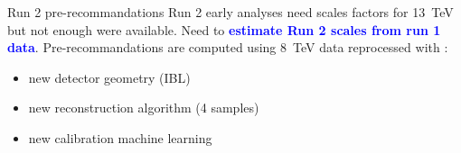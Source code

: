 \begin{frame}{Run 2 pre-recommandations}
  Run 2 early analyses need scales factors for 13~TeV but not enough were available.
  Need to \textcolor{blue}{ \bf estimate Run 2 scales from run 1 data}.
  \newline
  Pre-recommandations are computed using $8$~TeV data reprocessed with :
  \begin{itemize}
  \item new detector geometry (IBL)
  \item new reconstruction algorithm (4 samples)
  \item new calibration machine learning
  \end{itemize} 
  \begin{minipage}{0.49\linewidth}
  \end{minipage}
  \begin{minipage}{0.49\linewidth}
    \centering
  \end{minipage}
\end{frame}


